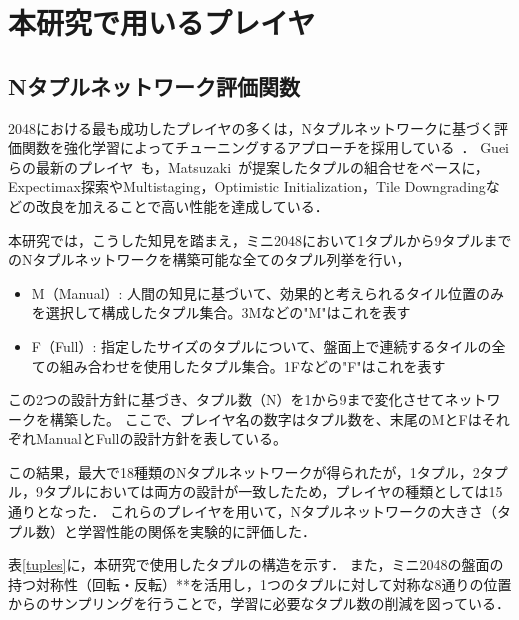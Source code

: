 \section{本研究で用いるプレイヤ}
\subsection{Nタプルネットワーク評価関数}
\label{sec:Ntuple}

2048における最も成功したプレイヤの多くは，Nタプルネットワークに基づく評価関数を強化学習によってチューニングするアプローチを採用している~\cite{SzJa14}．
Gueiらの最新のプレイヤ~\cite{GuCW22}も，Matsuzaki~\cite{Mats16}が提案したタプルの組合せをベースに，Expectimax探索やMultistaging\cite{YWHC16}，Optimistic Initialization，Tile Downgrading\cite{GuCW22}などの改良を加えることで高い性能を達成している．

本研究では，こうした知見を踏まえ，ミニ2048において1タプルから9タプルまでのNタプルネットワークを構築可能な全てのタプル列挙を行い，
\begin{itemize}
  \item M（Manual）: 人間の知見に基づいて、効果的と考えられるタイル位置のみを選択して構成したタプル集合。3Mなどの"M"はこれを表す
  \item F（Full）: 指定したサイズのタプルについて、盤面上で連続するタイルの全ての組み合わせを使用したタプル集合。1Fなどの"F"はこれを表す
\end{itemize}

この2つの設計方針に基づき、タプル数（N）を1から9まで変化させてネットワークを構築した。
ここで、プレイヤ名の数字はタプル数を、末尾のMとFはそれぞれManualとFullの設計方針を表している。

この結果，最大で18種類のNタプルネットワークが得られたが，1タプル，2タプル，9タプルにおいては両方の設計が一致したため，プレイヤの種類としては15通りとなった．
これらのプレイヤを用いて，Nタプルネットワークの大きさ（タプル数）と学習性能の関係を実験的に評価した．

表\ref{tuples}に，本研究で使用したタプルの構造を示す．
また，ミニ2048の盤面の持つ対称性（回転・反転）**を活用し，1つのタプルに対して対称な8通りの位置からのサンプリングを行うことで，学習に必要なタプル数の削減を図っている．

